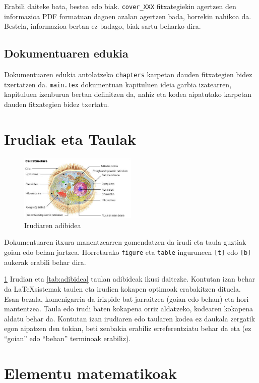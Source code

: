 Erabili daiteke bata, bestea edo biak. \texttt{cover\_XXX} fitxategiekin agertzen den informazioa PDF formatuan dagoen azalan agertzen bada, horrekin nahikoa da. Bestela, informazioa bertan ez badago, biak sartu beharko dira.

\subsection{Dokumentuaren edukia}

Dokumentuaren edukia antolatzeko \texttt{chapters} karpetan dauden fitxategien bidez txertatzen da. \texttt{main.tex} dokumentuan kapituluen ideia garbia izatearren, kapituluen izenburua bertan definitzen da, nahiz eta kodea aipatutako karpetan dauden fitxategien bidez txertatu.


\section{Irudiak eta Taulak}

\begin{figure}[t]
	\includegraphics[width=0.5\textwidth]{figures/cell.jpg}
	\caption{Irudiaren adibidea}\label{fig:adibidea}
\end{figure}

Dokumentuaren itxura manentzearren gomendatzen da irudi eta taula guztiak goian edo behan jartzea. Horretarako \texttt{figure} eta \texttt{table} inguruneen \texttt{[t]} edo \texttt{[b]} aukerak erabili behar dira.

\ref{fig:adibidea} Irudian eta \ref{tab:adibidea} taulan adibideak ikusi daitezke. Kontutan izan behar da \LaTeX sistemak taulen eta irudien kokapen optimoak erabakitzen dituela. Esan bezala, komenigarria da irizpide bat jarraitzea (goian edo behan) eta hori mantentzea. Taula edo irudi baten kokapena orriz aldatzeko, kodearen kokapena aldatu behar da. Kontutan izan irudiaren edo taularen kodea ez daukala zergatik egon aipatzen den tokian, beti zenbakia erabiliz erreferentziatu behar da eta (ez ``goian'' edo ``behan'' terminoak erabiliz).

\section{Elementu matematikoak}

